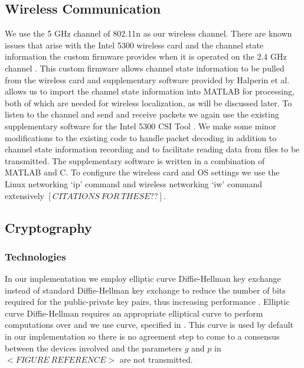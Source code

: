 \documentclass[12pt]{report}
\begin{document}
\subsection{Wireless Communication}
We use the 5 GHz channel of 802.11n as our wireless channel. There are known issues that arise with the Intel 5300 wireless card and the channel state information the custom firmware provides when it is operated on the 2.4 GHz channel \cite{PhaserGjengset2014,SpotFiKotaru2015}. This custom firmware allows channel state information to be pulled from the wireless card and supplementary software provided by Halperin et al. \cite{ChannelStateInformationToolReleaseHalperin2011} allows us to import the channel state information into MATLAB for processing, both of which are needed for wireless localization, as will be discussed later. To listen to the channel and send and receive packets we again use the existing supplementary software for the Intel 5300 CSI Tool \cite{ChannelStateInformationToolReleaseHalperin2011}. We make some minor modifications to the existing code to handle packet decoding in addition to channel state information recording and to facilitate reading data from files to be transmitted. The supplementary software is written in a combination of MATLAB and C. To configure the wireless card and OS settings we use the Linux networking `ip' command and wireless networking `iw' command extensively $[CITATIONS \: FOR \: THESE??]$. \par

\subsection{Cryptography}
\subsubsection{Technologies}
In our implementation we employ elliptic curve Diffie-Hellman key exchange instead of standard Diffie-Hellman key exchange to reduce the number of bits required for the public-private key pairs, thus increasing performance \cite{FastEllipticCurveDiffieHellmanBernstein2006}. Elliptic curve Diffie-Hellman requires an appropriate elliptical curve to perform computations over and we use curve, specified in \cite{EllipticCurvesStandard2009}. This curve is used by default in our implementation so there is no agreement step to come to a consensus between the devices involved and the parameters $g$ and $p$ in $<FIGURE \: REFERENCE>$ are not transmitted. \par
\end{document}
